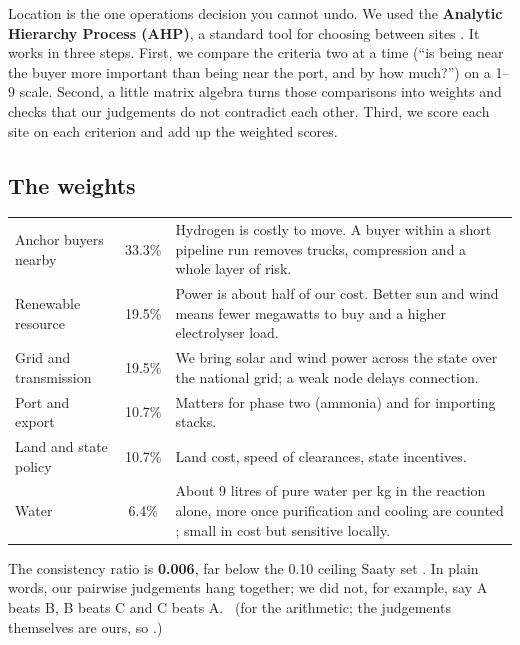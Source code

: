 \label{sec:site}

Location is the one operations decision you cannot undo. We used the \textbf{Analytic Hierarchy Process (AHP)}, a standard tool for choosing between sites \cite{saaty1980}. It works in three steps. First, we compare the criteria two at a time (``is being near the buyer more important than being near the port, and by how much?'') on a 1--9 scale. Second, a little matrix algebra turns those comparisons into weights and checks that our judgements do not contradict each other. Third, we score each site on each criterion and add up the weighted scores.

\subsection{The weights}
\begin{center}\tablefont
\begin{tabularx}{\textwidth}{@{}l c L@{}}
\toprule
{} &  & \\ \midrule
Anchor buyers nearby & 33.3\% & Hydrogen is costly to move. A buyer within a short pipeline run removes trucks, compression and a whole layer of risk.\\
Renewable resource & 19.5\% & Power is about half of our cost. Better sun and wind means fewer megawatts to buy and a higher electrolyser load.\\
Grid and transmission & 19.5\% & We bring solar and wind power across the state over the national grid; a weak node delays connection.\\
Port and export & 10.7\% & Matters for phase two (ammonia) and for importing stacks.\\
Land and state policy & 10.7\% & Land cost, speed of clearances, state incentives.\\
Water & 6.4\% & About 9 litres of pure water per kg in the reaction alone, more once purification and cooling are counted \cite{rmi2023}; small in cost but sensitive locally.\\
\bottomrule
\end{tabularx}
\end{center}
The consistency ratio is \textbf{0.006}, far below the 0.10 ceiling Saaty set \cite{saaty1980}. In plain words, our pairwise judgements hang together; we did not, for example, say A beats B, B beats C and C beats A. \confH\ (for the arithmetic; the judgements themselves are ours, so \confM.)

